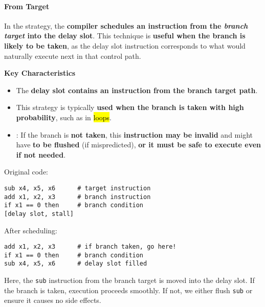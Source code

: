 \paragraph{From Target}\label{paragraph: From Target}

In the  strategy, the \textbf{compiler schedules an instruction from the \emph{branch target} into the delay slot}. This technique is \textbf{useful when the branch is likely to be taken}, as the delay slot instruction corresponds to what would naturally execute next in that control path.

\highspace
\begin{flushleft}
    \textcolor{Green3}{ \textbf{Key Characteristics}}
\end{flushleft}
\begin{itemize}
    \item The \textbf{delay slot contains an instruction from the branch target path}.
    \item This strategy is typically \textbf{used when the branch is taken with high probability}, such as in \hl{loops}.
    \item {}: If the branch is \textbf{not taken}, this \textbf{instruction may be invalid} and might have \textbf{to be flushed} (if mispredicted), \textbf{or it must be safe to execute even if not needed}.
\end{itemize}

\begin{examplebox}
    Original code:
    \begin{lstlisting}[language=riscv]
sub x4, x5, x6      # target instruction
add x1, x2, x3      # branch instruction
if x1 == 0 then     # branch condition
[delay slot, stall]\end{lstlisting}
    After scheduling:
    \begin{lstlisting}[language=riscv]
add x1, x2, x3      # if branch taken, go here!
if x1 == 0 then     # branch condition
sub x4, x5, x6      # delay slot filled\end{lstlisting}
    Here, the \texttt{sub} instruction from the branch target is moved into the delay slot. If the branch is taken, execution proceeds smoothly. If not, we either flush \texttt{sub} or ensure it causes no side effects.
\end{examplebox}


